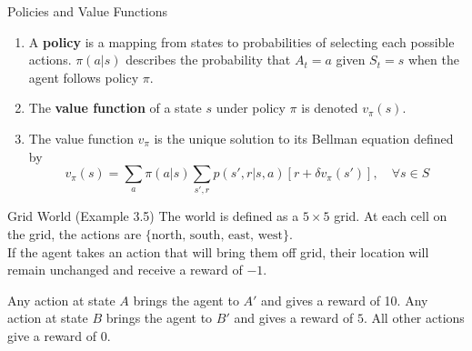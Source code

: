 \documentclass{beamer}
\begin{document}
\begin{frame}{Policies and Value Functions}
\begin{enumerate}
    \item A \textbf{policy} is a mapping from states to probabilities of selecting each possible actions. $\pi(a|s)$ describes the probability that $A_t = a$ given $S_t=s$ when the agent follows policy $\pi$.
    \item The \textbf{value function} of a state $s$ under policy $\pi$ is denoted $v_\pi(s)$.
    \item The value function $v_\pi$ is the unique solution to its Bellman equation defined by 
    \[
    v_\pi(s) = \sum_a \pi(a|s) \sum_{s',r}p(s',r|s,a)[r+\delta v_\pi(s')],\quad \forall s\in S
    \]
\end{enumerate}
\end{frame}

\begin{frame}{Grid World (Example 3.5)}
The world is defined as a $5\times 5$ grid. At each cell on the grid, the actions are $\{\text{north, south, east, west}\}$.\\

If the agent takes an action that will bring them off grid, their location will remain unchanged and receive a reward of $-1$.

Any action at state $A$ brings the agent to $A'$ and gives a reward of 10. Any action at state $B$ brings the agent to $B'$ and gives a reward of $5$. All other actions give a reward of 0.
\end{frame}
\end{document}
